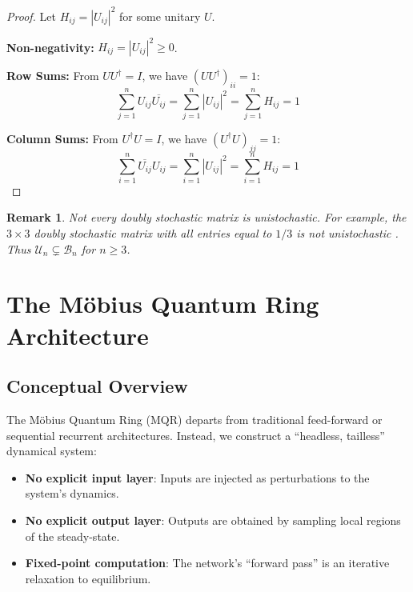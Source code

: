\documentclass[11pt,a4paper]{article}
\newtheorem{remark}[theorem]{Remark}
\newcommand{\U}{\mathcal{U}}
\newcommand{\B}{\mathcal{B}}
\begin{document}
\begin{proof}
Let $H_{ij} = |U_{ij}|^2$ for some unitary $U$.

\textbf{Non-negativity:} $H_{ij} = |U_{ij}|^2 \geq 0$. \checkmark

\textbf{Row Sums:} From $UU^\dagger = I$, we have $(UU^\dagger)_{ii} = 1$:
\begin{equation}
\sum_{j=1}^n U_{ij} \overline{U_{ij}} = \sum_{j=1}^n |U_{ij}|^2 = \sum_{j=1}^n H_{ij} = 1
\end{equation}

\textbf{Column Sums:} From $U^\dagger U = I$, we have $(U^\dagger U)_{jj} = 1$:
\begin{equation}
\sum_{i=1}^n \overline{U_{ij}} U_{ij} = \sum_{i=1}^n |U_{ij}|^2 = \sum_{i=1}^n H_{ij} = 1
\end{equation}
\end{proof}

\begin{remark}
Not every doubly stochastic matrix is unistochastic. For example, the $3 \times 3$ doubly stochastic matrix with all entries equal to $1/3$ is not unistochastic \citep{bengtsson2005birkhoff}. Thus $\U_n \subsetneq \B_n$ for $n \geq 3$.
\end{remark}

\section{The Möbius Quantum Ring Architecture}
\label{sec:architecture}

\subsection{Conceptual Overview}

The Möbius Quantum Ring (MQR) departs from traditional feed-forward or sequential recurrent architectures. Instead, we construct a ``headless, tailless'' dynamical system:

\begin{itemize}
    \item \textbf{No explicit input layer}: Inputs are injected as perturbations to the system's dynamics.
    \item \textbf{No explicit output layer}: Outputs are obtained by sampling local regions of the steady-state.
    \item \textbf{Fixed-point computation}: The network's ``forward pass'' is an iterative relaxation to equilibrium.
\end{itemize}
\end{document}
